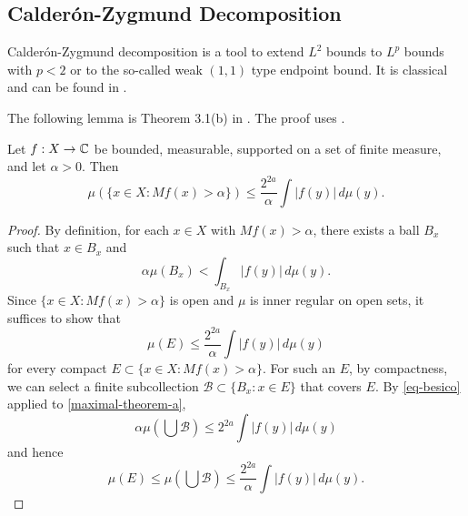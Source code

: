\subsection{Calder\'on-Zygmund Decomposition}
\label{subsec-CZD}
Calder\'on-Zygmund decomposition is a tool to extend $L^2$ bounds to $L^p$ bounds with $p<2$ or to the so-called weak $(1, 1)$ type endpoint bound.
It is classical and can be found in \cite{stein-book}.

The following lemma is Theorem 3.1(b) in \cite{stein-book}. The proof uses .
\begin{lemma}
    \label{maximal-theorem}
    \leanok
    Let $f: X \to \mathbb{C}$ be bounded, measurable, supported on a set of finite measure, and let $\alpha > 0$. Then
    \begin{equation}
        \label{maximal-theorem-equation}
        \mu(\{x\in X : Mf(x) > \alpha\}) \le \frac{2^{2a}}{\alpha} \int |f(y)|\, d\mu(y).
    \end{equation}
\end{lemma}
\begin{proof}
    \leanok
    By definition, for each $x\in X$ with $Mf(x) > \alpha$, there exists a ball $B_x$ such that $x\in B_x$ and
    \begin{equation}
        \label{maximal-theorem-a}
        \alpha \mu(B_x) < \int_{B_x} |f(y)|\, d\mu(y).
    \end{equation}
    Since $\{x\in X : Mf(x) > \alpha\}$ is open and $\mu$ is inner regular on open sets, it suffices to show that
    \begin{equation*}
        \mu(E) \le \frac{2^{2a}}{\alpha} \int |f(y)|\, d\mu(y)
    \end{equation*}
    for every compact $E\subset \{x\in X : Mf(x) > \alpha\}$.
    For such an $E$, by compactness, we can select a finite subcollection $\mathcal{B} \subset \{B_x: x\in E\}$ that covers $E$.
    By \eqref{eq-besico} applied to \eqref{maximal-theorem-a},
    \begin{equation}
        \alpha \mu(\bigcup \mathcal{B}) \le 2^{2a} \int |f(y)|\,d\mu(y)
    \end{equation}
    and hence
    \begin{equation*}
        \mu(E) \le \mu(\bigcup \mathcal{B}) \le \frac{2^{2a}}{\alpha} \int |f(y)|\,d\mu(y).
    \end{equation*}
\end{proof}

